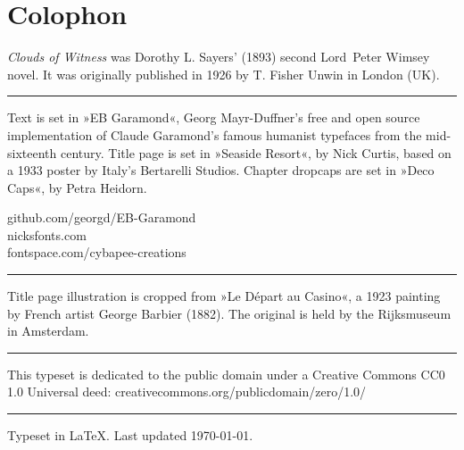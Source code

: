 \documentclass[
paper=5.5in:8.5in,
]{scrbook} %
\begin{document}
\mainmatter
\pagestyle{headings}
\renewcommand*{\chapterpagestyle}{plain}





















\renewcommand*{\chapterheadendvskip}{\vspace{10pt}}
\renewcommand*{\chapterheadstartvskip}{\vspace{0pt}}

\clearpage
{}
\chapter*{Colophon}
\centering
\begin{minipage}{\textwidth}
\textit{Clouds of Witness} was Dorothy L. Sayers' (1893) second Lord~Peter Wimsey novel. It was originally published in 1926 by T. Fisher Unwin in London (UK).
\end{minipage}
\vfill
\rule{0.5\textwidth}{.4pt}
\vfill
\begin{minipage}{\textwidth}
Text is set in »EB Garamond«, Georg Mayr-Duffner's free and open source implementation of Claude Garamond’s famous humanist typefaces from the mid-sixteenth century. Title page is set in »Seaside Resort«, by Nick Curtis, based on a 1933 poster by Italy’s Bertarelli Studios. Chapter dropcaps are set in »Deco Caps«, by Petra Heidorn.
\end{minipage}
\vfill
github.com/georgd/EB-Garamond\\
nicksfonts.com\\
fontspace.com/cybapee-creations
\vfill
\rule{0.5\textwidth}{.4pt}
\vfill
\begin{minipage}{\textwidth}
Title page illustration is cropped from »Le Départ au Casino«, a 1923 painting by French artist George Barbier (1882). The original is held by the Rijksmuseum in Amsterdam.
\end{minipage}
\vfill
\rule{0.5\textwidth}{.4pt}
\vfill
\begin{minipage}{\textwidth}
This typeset is dedicated to the public domain under a Creative Commons CC0 1.0 Universal deed: creativecommons.org/publicdomain/zero/1.0/
\end{minipage}
\vfill
\rule{0.5\textwidth}{.4pt}
\vfill
Typeset in \LaTeX{}. Last updated \today.

\thispagestyle{empty}
\end{document}
